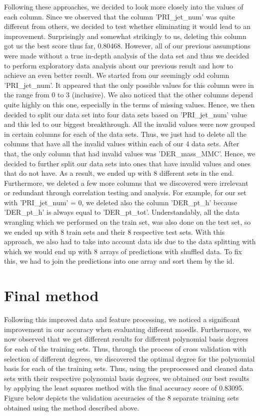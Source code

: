 \documentclass[10pt,conference,compsocconf]{IEEEtran}
\begin{document}
Following these approaches, we decided to look more closely into the values of each column. Since we observed that the column 'PRI\_jet\_num' was quite different from others, we decided to test whether eliminating it would lead to an improvement. Surprisingly and somewhat strikingly to us, deleting this column got us the best score thus far, 0.80468. However, all of our previous assumptions were made without a true in-depth analysis of the data set and thus we decided to perform exploratory data analysis about our previous result and how to achieve an even better result. We started from our seemingly odd column 'PRI\_jet\_num'. It appeared that the only possible values for this column were in the range from 0 to 3 (inclusive). We also noticed that the other columns depend quite highly on this one, especially in the terms of missing values. Hence, we then decided to split our data set into four data sets based on 'PRI\_jet\_num' value and this led to our biggest breakthrough. All the invalid values were now grouped in certain columns for each of the data sets. Thus, we just had to delete all the columns that have all the invalid values within each of our 4 data sets. After that, the only column that had invalid values was 'DER\_mass\_MMC'. Hence, we decided to further split our data sets into ones that have invalid values and ones that do not have. As a result, we ended up with 8 different sets in the end. Furthermore, we deleted a few more columns that we discovered were irrelevant or redundant through correlation testing and analysis. For example, for our set with 'PRI\_jet\_num' = 0, we deleted also the column 'DER\_pt\_h' because 'DER\_pt\_h' is always equal to 'DER\_pt\_tot'. Understandably, all the data wrangling which we performed on the train set, was also done on the test set, so we ended up with 8 train sets and their 8 respective test sets. With this approach, we also had to take into account data ids due to the data splitting with which we would end up with 8 arrays of predictions with shuffled data. To fix this, we had to join the predictions into one array and sort them by the id.

\section{Final method}

Following this improved data and feature processing, we noticed a significant improvement in our accuracy when evaluating different moedls. Furthermore, we now observed that we get different results for different polynomial basis degrees for each of the training sets. Thus, through the process of cross validation with selection of different degrees, we discovered the optimal degree for the polynomial basis for each of the training sets. Thus, using the preprocessed and cleaned data sets with their respective polynomial basis degrees, we obtained our best results by applying the least squares method with the final accuracy score of 0.83095. Figure below depicts the validation accuracies of the 8 separate training sets obtained using the method described above.
\end{document}
